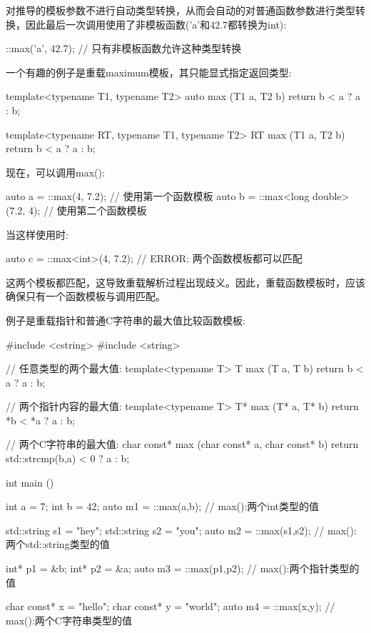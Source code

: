 对推导的模板参数不进行自动类型转换，从而会自动的对普通函数参数进行类型转换，因此最后一次调用使用了非模板函数('a'和42.7都转换为int):

\begin{cpp}
::max('a', 42.7); // 只有非模板函数允许这种类型转换
\end{cpp}

一个有趣的例子是重载maximum模板，其只能显式指定返回类型:

\begin{cpp}
template<typename T1, typename T2>
auto max (T1 a, T2 b)
{
	return b < a ? a : b;
}

template<typename RT, typename T1, typename T2>
RT max (T1 a, T2 b)
{
	return b < a ? a : b;
}
\end{cpp}

现在，可以调用max():

\begin{cpp}
auto a = ::max(4, 7.2); // 使用第一个函数模板
auto b = ::max<long double>(7.2, 4); // 使用第二个函数模板
\end{cpp}

当这样使用时:

\begin{cpp}
auto c = ::max<int>(4, 7.2); // ERROR: 两个函数模板都可以匹配
\end{cpp}

这两个模板都匹配，这导致重载解析过程出现歧义。因此，重载函数模板时，应该确保只有一个函数模板与调用匹配。

例子是重载指针和普通C字符串的最大值比较函数模板:

\begin{cpp}
#include <cstring>
#include <string>

// 任意类型的两个最大值:
template<typename T>
T max (T a, T b)
{
	return b < a ? a : b;
}

// 两个指针内容的最大值:
template<typename T>
T* max (T* a, T* b)
{
	return *b < *a ? a : b;
}

// 两个C字符串的最大值:
char const* max (char const* a, char const* b)
{
	return std::strcmp(b,a) < 0 ? a : b;
}

int main ()
{
	int a = 7;
	int b = 42;
	auto m1 = ::max(a,b); // max():两个int类型的值
	
	std::string s1 = "hey";
	std::string s2 = "you";
	auto m2 = ::max(s1,s2); // max():两个std::string类型的值
	
	int* p1 = &b;
	int* p2 = &a;
	auto m3 = ::max(p1,p2); // max():两个指针类型的值
	
	char const* x = "hello";
	char const* y = "world";
	auto m4 = ::max(x,y); // max():两个C字符串类型的值
}
\end{cpp}

